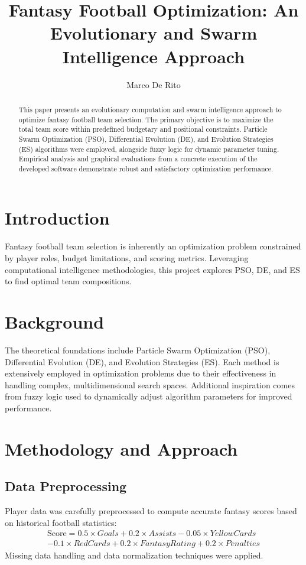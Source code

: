 \documentclass[sigconf]{acmart}
\title{Fantasy Football Optimization: An Evolutionary and Swarm Intelligence Approach}
\author{Marco De Rito}
\affiliation{%
	\institution{University of Trieste}
	\city{Trieste}
	\country{Italy}}
\begin{document}
	\maketitle
	
	\begin{abstract}
		This paper presents an evolutionary computation and swarm intelligence approach to optimize fantasy football team selection. The primary objective is to maximize the total team score within predefined budgetary and positional constraints. Particle Swarm Optimization (PSO), Differential Evolution (DE), and Evolution Strategies (ES) algorithms were employed, alongside fuzzy logic for dynamic parameter tuning. Empirical analysis and graphical evaluations from a concrete execution of the developed software demonstrate robust and satisfactory optimization performance.
	\end{abstract}
	
	
	\section{Introduction}
	Fantasy football team selection is inherently an optimization problem constrained by player roles, budget limitations, and scoring metrics. Leveraging computational intelligence methodologies, this project explores PSO, DE, and ES to find optimal team compositions.
	
	\section{Background}
	The theoretical foundations include Particle Swarm Optimization (PSO), Differential Evolution (DE), and Evolution Strategies (ES). Each method is extensively employed in optimization problems due to their effectiveness in handling complex, multidimensional search spaces. Additional inspiration comes from fuzzy logic used to dynamically adjust algorithm parameters for improved performance.
	
	\section{Methodology and Approach}
	
	\subsection{Data Preprocessing}
	Player data was carefully preprocessed to compute accurate fantasy scores based on historical football statistics:
	\begin{multline}
		\text{Score} = 0.5\times Goals + 0.2\times Assists - 0.05\times YellowCards \\ - 0.1\times RedCards + 0.2\times FantasyRating + 0.2\times Penalties
	\end{multline}
	Missing data handling and data normalization techniques were applied.
	
\end{document}
